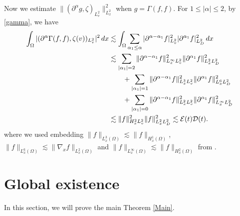 \documentclass[reqno,a4paper]{amsart}
\numberwithin{equation}{section}
\newcommand{\1}{\mathbf{1}}
\newcommand{\E}{\mathcal{E}}
\newcommand{\D}{\mathcal{D}}
\newcommand{\na}{\nabla}
\newcommand{\<}{\langle}
\renewcommand{\>}{\rangle}
\begin{document}
Now we estimate $\|({\partial^\alpha g},\zeta)_{L^2_v}\|^2_{L^2_{x}}$ when $g=\Gamma(f,f)$. For $1\le|\alpha|\le 2$, by \eqref{gamma}, we have 
		\begin{align}
			\label{135}
			\int_{\Omega}|({\partial^\alpha\Gamma(f,f)},\zeta(v))_{L^2_{v}}|^2\,dx
			&\notag\lesssim \int_{\Omega}\sum_{\alpha_1\le\alpha}|{\partial^{\alpha-\alpha_1} f}|^2_{L^2_v}|{\partial^{\alpha_1} f}|^2_{L^2_{D}}\,dx\\
			&\notag\lesssim \sum_{|\alpha_1|=2}\|{\partial^{\alpha-\alpha_1} f}\|^2_{L^\infty_xL^2_v}\|{\partial^{\alpha_1} f}\|^2_{L^2_xL^2_{D}}\\
			&\notag\qquad+\sum_{|\alpha_1|=1}\|{\partial^{\alpha-\alpha_1} f}\|^2_{L^3_xL^2_v}\|{\partial^{\alpha_1} f}\|^2_{L^6_xL^2_{D}}\\
			&\notag\qquad+\sum_{|\alpha_1|=0}\|{\partial^{\alpha-\alpha_1} f}\|^2_{L^2_xL^2_v}\|{\partial^{\alpha_1} f}\|^2_{L^\infty_xL^2_{D}}\\
			&\lesssim \|{ f}\|^2_{H^2_xL^2_v}\| {f}\|^2_{L^2_xL^2_{D}}\lesssim \E(t)\D(t). 
		\end{align}where we used embedding $\|f\|_{L^3_x(\Omega)}\lesssim\|f\|_{H^1_x(\Omega)}$, $\|f\|_{L^6_x(\Omega)}\lesssim\|\na_xf\|_{L^2_x(\Omega)}$ and $\|f\|_{L^\infty_x(\Omega)}\lesssim\|f\|_{H^2_x(\Omega)}$ from \cite[Section V]{Adams2003}. 
	
	








\section{Global existence}\label{Sec4}
In this section, we will prove the main Theorem \ref{Main}. 
\end{document}
